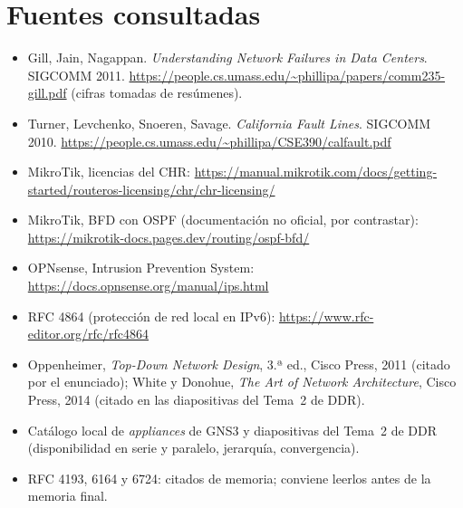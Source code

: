\documentclass[11pt,a4paper]{article}
\begin{document}
\section{Fuentes consultadas}
\begin{itemize}
\item Gill, Jain, Nagappan. \textit{Understanding Network Failures in Data Centers}. SIGCOMM 2011. \url{https://people.cs.umass.edu/~phillipa/papers/comm235-gill.pdf} (cifras tomadas de resúmenes).
\item Turner, Levchenko, Snoeren, Savage. \textit{California Fault Lines}. SIGCOMM 2010. \url{https://people.cs.umass.edu/~phillipa/CSE390/calfault.pdf}
\item MikroTik, licencias del CHR: \url{https://manual.mikrotik.com/docs/getting-started/routeros-licensing/chr/chr-licensing/}
\item MikroTik, BFD con OSPF (documentación no oficial, por contrastar): \url{https://mikrotik-docs.pages.dev/routing/ospf-bfd/}
\item OPNsense, Intrusion Prevention System: \url{https://docs.opnsense.org/manual/ips.html}
\item RFC 4864 (protección de red local en IPv6): \url{https://www.rfc-editor.org/rfc/rfc4864}
\item Oppenheimer, \textit{Top-Down Network Design}, 3.ª ed., Cisco Press, 2011 (citado por el enunciado); White y Donohue, \textit{The Art of Network Architecture}, Cisco Press, 2014 (citado en las diapositivas del Tema~2 de DDR).
\item Catálogo local de \textit{appliances} de GNS3 y diapositivas del Tema~2 de DDR (disponibilidad en serie y paralelo, jerarquía, convergencia).
\item RFC 4193, 6164 y 6724: citados de memoria; conviene leerlos antes de la memoria final.
\end{itemize}
\end{document}
